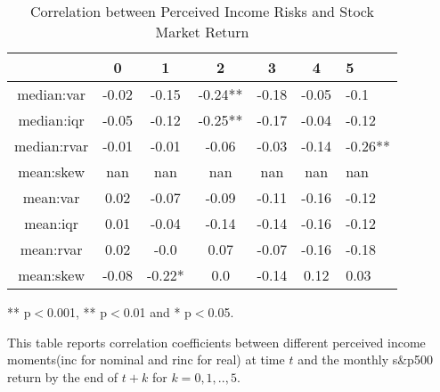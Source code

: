 \documentclass[12pt,notitlepage,onecolumn,aps,pra]{article}
\begin{document}
\begin{table}[ht]
\centering
\begin{threeparttable}
\caption{Correlation between Perceived Income Risks and Stock Market Return}
\label{macro_corr}\begin{tabular}{ccccccl}
\toprule
{} &      0 &       1 &        2 &      3 &      4 &        5 \\
\midrule
median:var  &  -0.02 &   -0.15 &  -0.24** &  -0.18 &  -0.05 &     -0.1 \\
median:iqr  &  -0.05 &   -0.12 &  -0.25** &  -0.17 &  -0.04 &    -0.12 \\
median:rvar &  -0.01 &   -0.01 &    -0.06 &  -0.03 &  -0.14 &  -0.26** \\
mean:skew   &    nan &     nan &      nan &    nan &    nan &      nan \\
mean:var    &   0.02 &   -0.07 &    -0.09 &  -0.11 &  -0.16 &    -0.12 \\
mean:iqr    &   0.01 &   -0.04 &    -0.14 &  -0.14 &  -0.16 &    -0.12 \\
mean:rvar   &   0.02 &    -0.0 &     0.07 &  -0.07 &  -0.16 &    -0.18 \\
mean:skew   &  -0.08 &  -0.22* &      0.0 &  -0.14 &   0.12 &     0.03 \\
\bottomrule
\end{tabular}
\begin{tablenotes}
\item *** p$<$0.001, ** p$<$0.01 and * p$<$0.05. 
\item This table reports correlation coefficients between different perceived income moments(inc for nominal 
and rinc for real) at time 
$t$ and the monthly s\&p500 return by the end of $t+k$ for $k=0,1,..,5$. 
\end{tablenotes}
\end{threeparttable}
\end{table}
\end{document}
